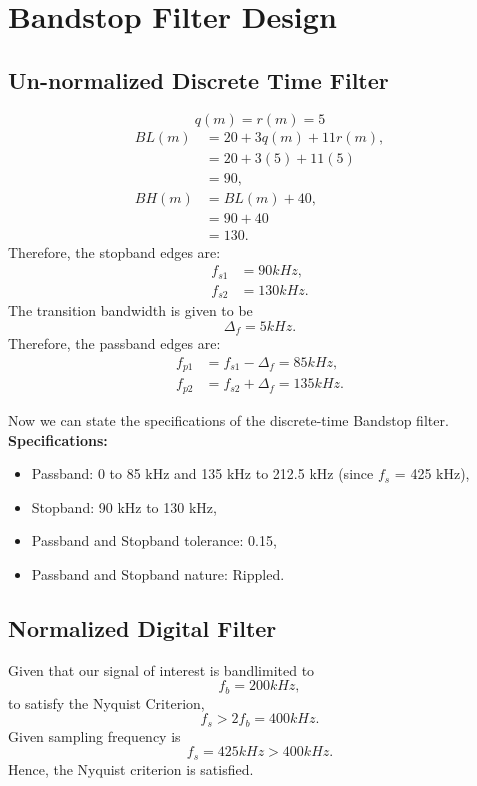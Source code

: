 \documentclass[12pt]{article}
\begin{document}
\newpage

\section{Bandstop Filter Design}
\subsection{Un-normalized Discrete Time Filter}
\[q(m) = r(m) = 5\]
\begin{align*}
    BL(m) &= 20 + 3 q(m) + 11 r(m),\\
    &= 20 + 3(5) + 11(5)\\
    &= 90,\\
    BH(m) &= BL(m) + 40,\\
    &= 90 + 40\\
    &= 130.
\end{align*}
Therefore, the stopband edges are:
\begin{align*}
    f_{s1} &= 90 kHz,\\
    f_{s2} &= 130 kHz.
\end{align*}
The transition bandwidth is given to be\[\Delta_f = 5 kHz.\]
Therefore, the passband edges are:
\begin{align*}
    f_{p1} &= f_{s1} - \Delta_f = 85 kHz,\\
    f_{p2} &= f_{s2} + \Delta_f = 135 kHz.
\end{align*}

Now we can state the specifications of the discrete-time Bandstop filter.
\hline
\vspace{10pt}
\textbf{Specifications:}
\begin{itemize}
    \item Passband: 0 to 85 kHz and 135 kHz to 212.5 kHz (since $f_s$ = 425 kHz),
    \item Stopband: 90 kHz to 130 kHz,
    \item Passband and Stopband tolerance: 0.15,
    \item Passband and Stopband nature: Rippled.
\end{itemize}
\hline

\subsection{Normalized Digital Filter}
Given that our signal of interest is bandlimited to
\[f_b = 200 kHz,\]
to satisfy the Nyquist Criterion,
\[f_s > 2 f_b = 400 kHz.\]
Given sampling frequency is
\[f_s = 425 kHz > 400 kHz.\]
Hence, the Nyquist criterion is satisfied.
\end{document}
